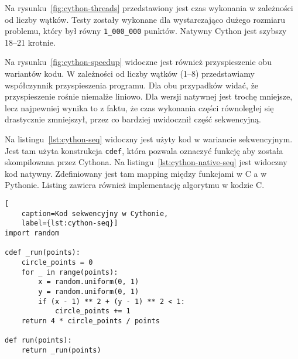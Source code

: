 \begin{figure*}
    \centering
    \begin{minipage}[b]{.45\textwidth}
        \centering
        
        \caption{Czas wykonania algorytmu w Cythonie w zależności od liczby wątków}
        \label{fig:cython-threads}
    \end{minipage}
    \hfill
    \begin{minipage}[b]{.45\textwidth}
        \centering
        
        \caption{Przyspieszenie liczenia liczby $\pi$ w Cythonie}
        \label{fig:cython-speedup}
    \end{minipage}
\end{figure*}

Na rysunku~\ref{fig:cython-threads} przedstawiony jest czas wykonania
w zależności od liczby wątków.
Testy zostały wykonane dla wystarczająco dużego rozmiaru problemu,
który był równy \texttt{1\_000\_000} punktów.
Natywny Cython jest szybszy 18--21 krotnie.

Na rysunku~\ref{fig:cython-speedup} widoczne jest również przyspieszenie
obu wariantów kodu.
W zależności od liczby wątków (1--8) przedstawiamy współczynnik
przyspieszenia programu.
Dla obu przypadków widać, że przyspieszenie rośnie niemalże liniowo.
Dla wersji natywnej jest trochę mniejsze, lecz najpewniej wynika to z faktu,
że czas wykonania części równoległej się drastycznie zmniejszył,
przez co bardziej uwidocznił część sekwencyjną.

Na listingu~\ref{lst:cython-seq} widoczny jest użyty kod w wariancie
sekwencyjnym.
Jest tam użyta konstrukcja \texttt{cdef}, która pozwala
oznaczyć funkcję aby została skompilowana przez Cythona.
Na listingu~\ref{lst:cython-native-seq} jest widoczny kod
natywny.
Zdefiniowany jest tam mapping między funkcjami w C a w Pythonie.
Listing zawiera również implementację algorytmu w kodzie C\@.

\begin{lstlisting}[
    caption=Kod sekwencyjny w Cythonie,
    label={lst:cython-seq}]
import random

cdef _run(points):
    circle_points = 0
    for _ in range(points):
        x = random.uniform(0, 1)
        y = random.uniform(0, 1)
        if (x - 1) ** 2 + (y - 1) ** 2 < 1:
            circle_points += 1
    return 4 * circle_points / points

def run(points):
    return _run(points)

\end{lstlisting}

